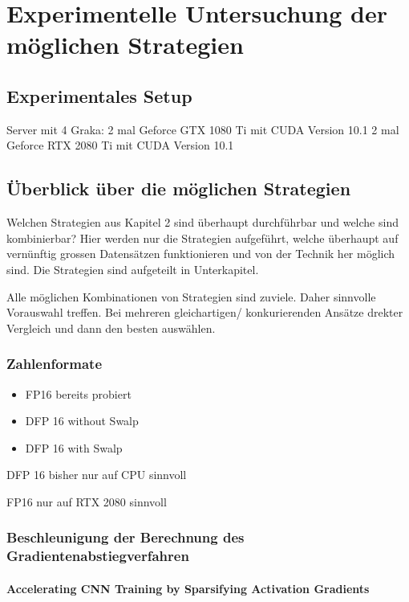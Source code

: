\chapter{Experimentelle Untersuchung der möglichen Strategien}



\section{Experimentales Setup}
Server mit 4 Graka:
2 mal Geforce GTX 1080 Ti mit CUDA Version 10.1 
2 mal Geforce RTX 2080 Ti mit CUDA Version 10.1


\section{Überblick über die möglichen Strategien}

Welchen Strategien aus Kapitel 2 sind überhaupt durchführbar und welche sind kombinierbar?
Hier werden nur die Strategien aufgeführt, welche überhaupt auf vernünftig grossen Datensätzen funktionieren und von der Technik her möglich sind.
Die Strategien sind aufgeteilt in Unterkapitel. 

Alle möglichen Kombinationen von Strategien sind zuviele. Daher sinnvolle Vorauswahl treffen.  
Bei mehreren gleichartigen/ konkurierenden Ansätze drekter Vergleich und dann den besten auswählen.
\subsection{Zahlenformate}

\begin{itemize}
 \item FP16 bereits probiert
 \item DFP 16 without Swalp
 \item DFP 16 with Swalp
\end{itemize}

DFP 16 bisher nur auf CPU sinnvoll

FP16 nur auf RTX 2080 sinnvoll

\subsection{Beschleunigung der Berechnung des Gradientenabstiegverfahren}


\subsubsection{Accelerating CNN Training by Sparsifying Activation Gradients}


